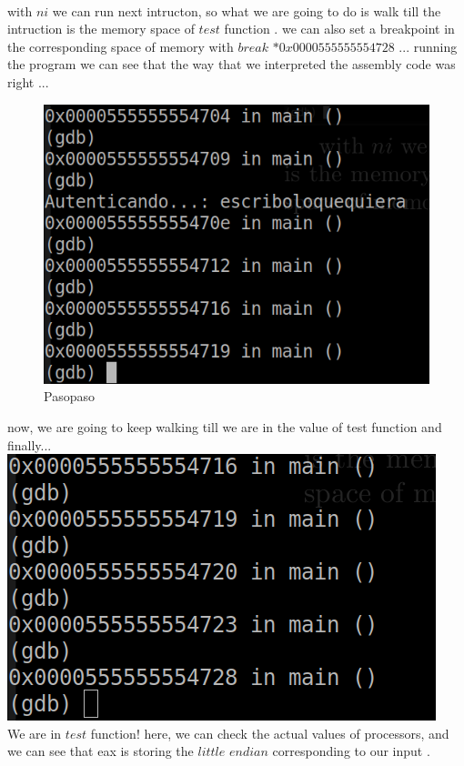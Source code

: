 \documentclass[10pt,a4paper]{article} %
\begin{document}
            \\  with $ ni  $ we can run next intructon, so what we are going to do is walk till the
            intruction is the memory space of $ test  $ function . we can also set
            a breakpoint in the corresponding space of memory with $ break $   $
            *0x0000555555554728  $ ... running the program we can see that the way
            that we interpreted the assembly code was right ...
            \begin{figure}[h!]
                \centering
                \includegraphics[width=0.4\linewidth]{pasopaso.png}
                \caption{Pasopaso}
                \label{fig:pasopaso}
            \end{figure}
            now, we are going to keep walking till we are in the value of test function and finally...
            \\ \includegraphics[width=0.5\linewidth]{testaca.png}
            \\ We are in $ test  $ function! here, we can check the actual values
            of processors, and we can see that eax is storing the $ little $   $
            endian  $ corresponding to our input .
\end{document}
